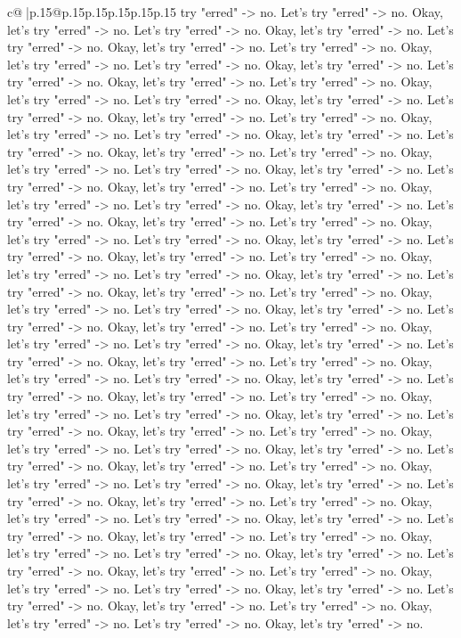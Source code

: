 \documentclass{article}
\begin{document}
{\begin{supertabular}{c@{$\;$}|p{.15\linewidth}@{}p{.15\linewidth}p{.15\linewidth}p{.15\linewidth}p{.15\linewidth}p{.15\linewidth}}
{{{try "erred" {-}> no. Let's try "erred" {-}> no. Okay, let's try "erred" {-}> no. Let's try "erred" {-}> no. Okay, let's try "erred" {-}> no. Let's try "erred" {-}> no. Okay, let's try "erred" {-}> no. Let's try "erred" {-}> no. Okay, let's try "erred" {-}> no. Let's try "erred" {-}> no. Okay, let's try "erred" {-}> no. Let's try "erred" {-}> no. Okay, let's try "erred" {-}> no. Let's try "erred" {-}> no. Okay, let's try "erred" {-}> no. Let's try "erred" {-}> no. Okay, let's try "erred" {-}> no. Let's try "erred" {-}> no. Okay, let's try "erred" {-}> no. Let's try "erred" {-}> no. Okay, let's try "erred" {-}> no. Let's try "erred" {-}> no. Okay, let's try "erred" {-}> no. Let's try "erred" {-}> no. Okay, let's try "erred" {-}> no. Let's try "erred" {-}> no. Okay, let's try "erred" {-}> no. Let's try "erred" {-}> no. Okay, let's try "erred" {-}> no. Let's try "erred" {-}> no. Okay, let's try "erred" {-}> no. Let's try "erred" {-}> no. Okay, let's try "erred" {-}> no. Let's try "erred" {-}> no. Okay, let's try "erred" {-}> no. Let's try "erred" {-}> no. Okay, let's try "erred" {-}> no. Let's try "erred" {-}> no. Okay, let's try "erred" {-}> no. Let's try "erred" {-}> no. Okay, let's try "erred" {-}> no. Let's try "erred" {-}> no. Okay, let's try "erred" {-}> no. Let's try "erred" {-}> no. Okay, let's try "erred" {-}> no. Let's try "erred" {-}> no. Okay, let's try "erred" {-}> no. Let's try "erred" {-}> no. Okay, let's try "erred" {-}> no. Let's try "erred" {-}> no. Okay, let's try "erred" {-}> no. Let's try "erred" {-}> no. Okay, let's try "erred" {-}> no. Let's try "erred" {-}> no. Okay, let's try "erred" {-}> no. Let's try "erred" {-}> no. Okay, let's try "erred" {-}> no. Let's try "erred" {-}> no. Okay, let's try "erred" {-}> no. Let's try "erred" {-}> no. Okay, let's try "erred" {-}> no. Let's try "erred" {-}> no. Okay, let's try "erred" {-}> no. Let's try "erred" {-}> no. Okay, let's try "erred" {-}> no. Let's try "erred" {-}> no. Okay, let's try "erred" {-}> no. Let's try "erred" {-}> no. Okay, let's try "erred" {-}> no. Let's try "erred" {-}> no. Okay, let's try "erred" {-}> no. Let's try "erred" {-}> no. Okay, let's try "erred" {-}> no. Let's try "erred" {-}> no. Okay, let's try "erred" {-}> no. Let's try "erred" {-}> no. Okay, let's try "erred" {-}> no. Let's try "erred" {-}> no. Okay, let's try "erred" {-}> no. Let's try "erred" {-}> no. Okay, let's try "erred" {-}> no. Let's try "erred" {-}> no. Okay, let's try "erred" {-}> no. Let's try "erred" {-}> no. Okay, let's try "erred" {-}> no. Let's try "erred" {-}> no. Okay, let's try "erred" {-}> no. Let's try "erred" {-}> no. Okay, let's try "erred" {-}> no. Let's try "erred" {-}> no. Okay, let's try "erred" {-}> no. Let's try "erred" {-}> no. Okay, let's try "erred" {-}> no. Let's try "erred" {-}> no. Okay, let's try "erred" {-}> no. Let's try "erred" {-}> no. Okay, let's try "erred" {-}> no. Let's try "erred" {-}> no. Okay, let's try "erred" {-}> no. Let's try "erred" {-}> no. Okay, let's try "erred" {-}> no. Let's try "erred" {-}> no. Okay, let's try "erred" {-}> no. Let's try "erred" {-}> no. Okay, let's try "erred" {-}> no. Let's try "erred" {-}> no. Okay, let's try "erred" {-}> no. }}}
\end{supertabular}}
\end{document}

